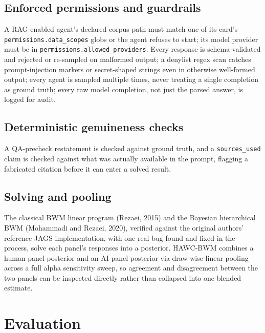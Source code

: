 \documentclass[11pt]{article}
\begin{document}
\subsection{Enforced permissions and guardrails}
A RAG-enabled agent's declared corpus path must match one of its card's
\texttt{permissions.data\_scopes} globs or the agent refuses to start; its
model provider must be in \texttt{permissions.allowed\_providers}. Every
response is schema-validated and rejected or re-sampled on malformed
output; a denylist regex scan catches prompt-injection markers or
secret-shaped strings even in otherwise well-formed output; every agent
is sampled multiple times, never treating a single completion as ground
truth; every raw model completion, not just the parsed answer, is logged
for audit.

\subsection{Deterministic genuineness checks}
A QA-precheck restatement is checked against ground truth, and a
\texttt{sources\_used} claim is checked against what was actually
available in the prompt, flagging a fabricated citation before it can
enter a solved result.

\subsection{Solving and pooling}
The classical BWM linear program (Rezaei, 2015) and the Bayesian
hierarchical BWM (Mohammadi and Rezaei, 2020), verified against the
original authors' reference JAGS implementation, with one real bug found
and fixed in the process, solve each panel's responses into a posterior.
HAWC-BWM combines a human-panel posterior and an AI-panel posterior via
draw-wise linear pooling across a full alpha sensitivity sweep, so
agreement and disagreement between the two panels can be inspected
directly rather than collapsed into one blended estimate.

\section{Evaluation}
\label{sec:evaluation}
\end{document}
